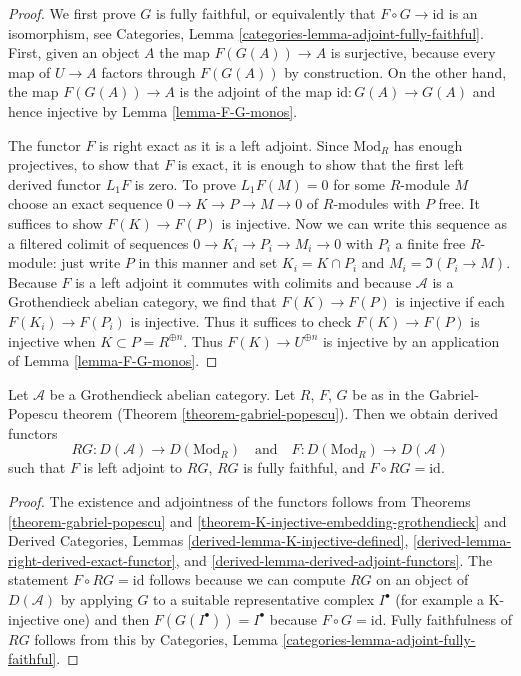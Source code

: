 \begin{proof}
We first prove $G$ is fully faithful, or equivalently that
$F \circ G \to \text{id}$ is an isomorphism, see
Categories, Lemma \ref{categories-lemma-adjoint-fully-faithful}.
First, given an object $A$ the map $F(G(A)) \to A$ is surjective,
because every map of $U \to A$ factors through $F(G(A))$ by construction.
On the other hand, the map $F(G(A)) \to A$ is the adjoint of the
map $\text{id} : G(A) \to G(A)$ and hence injective by
Lemma \ref{lemma-F-G-monos}.

\medskip\noindent
The functor $F$ is right exact as it is a left adjoint.
Since $\text{Mod}_R$ has enough projectives, to show that
$F$ is exact, it is enough to show that the first left derived
functor $L_1F$ is zero. To prove $L_1F(M) = 0$ for some $R$-module $M$
choose an exact sequence $0 \to K \to P \to M \to 0$
of $R$-modules with $P$ free. It suffices to show $F(K) \to F(P)$
is injective. Now we can write this sequence as a filtered
colimit of sequences $0 \to K_i \to P_i \to M_i \to 0$
with $P_i$ a finite free $R$-module: just write $P$ in this
manner and set $K_i = K \cap P_i$ and $M_i = \Im(P_i \to M)$.
Because $F$ is a left adjoint it commutes
with colimits and because $\mathcal{A}$ is a Grothendieck
abelian category, we find that $F(K) \to F(P)$
is injective if each $F(K_i) \to F(P_i)$ is injective.
Thus it suffices to check $F(K) \to F(P)$
is injective when $K \subset P = R^{\oplus n}$.
Thus $F(K) \to U^{\oplus n}$ is injective by an application
of Lemma \ref{lemma-F-G-monos}.
\end{proof}

\begin{lemma}
\label{lemma-gabriel-popescu}
\begin{reference}
\cite[Corollary 4.1]{serpe}
\end{reference}
Let $\mathcal{A}$ be a Grothendieck abelian category. Let
$R$, $F$, $G$ be as in the Gabriel-Popescu theorem
(Theorem \ref{theorem-gabriel-popescu}). Then we obtain
derived functors
$$
RG : D(\mathcal{A}) \to D(\text{Mod}_R)
\quad\text{and}\quad
F : D(\text{Mod}_R) \to D(\mathcal{A})
$$
such that $F$ is left adjoint to $RG$, $RG$ is fully faithful,
and $F \circ RG = \text{id}$.
\end{lemma}

\begin{proof}
The existence and adjointness of the functors follows from
Theorems \ref{theorem-gabriel-popescu} and
\ref{theorem-K-injective-embedding-grothendieck}
and
Derived Categories, Lemmas \ref{derived-lemma-K-injective-defined},
\ref{derived-lemma-right-derived-exact-functor}, and
\ref{derived-lemma-derived-adjoint-functors}.
The statement $F \circ RG = \text{id}$ follows because we can
compute $RG$ on an object of $D(\mathcal{A})$ by applying $G$
to a suitable representative complex $I^\bullet$ (for example
a K-injective one) and then $F(G(I^\bullet)) = I^\bullet$
because $F \circ G = \text{id}$. Fully faithfulness of $RG$
follows from this by
Categories, Lemma \ref{categories-lemma-adjoint-fully-faithful}.
\end{proof}





